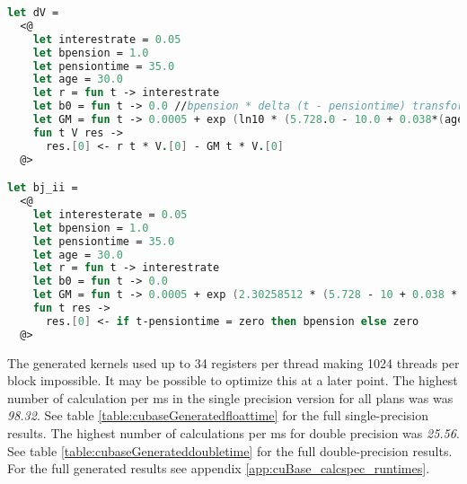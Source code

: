 \begin{lstlisting}[language=fsharp, caption=Formatted quotation AST for dV and bj\_ii methods, label=pe_quote_format]
let dV = 
  <@
    let interestrate = 0.05
    let bpension = 1.0
    let pensiontime = 35.0
    let age = 30.0
    let r = fun t -> interestrate
    let b0 = fun t -> 0.0 //bpension * delta (t - pensiontime) transformed into bj_ii value
    let GM = fun t -> 0.0005 + exp (ln10 * (5.728.0 - 10.0 + 0.038*(age + t))) // power expression converted to exponential function expressions
    fun t V res ->
      res.[0] <- r t * V.[0] - GM t * V.[0]
  @>

let bj_ii = 
  <@
    let interesterate = 0.05
    let bpension = 1.0
    let pensiontime = 35.0
    let age = 30.0
    let r = fun t -> interestrate
    let b0 = fun t -> 0.0
    let GM = fun t -> 0.0005 + exp (2.30258512 * (5.728 - 10 + 0.038 * (age + t)))
    fun t res ->
      res.[0] <- if t-pensiontime = zero then bpension else zero
  @>

\end{lstlisting}


The generated kernels used up to 34 registers per thread making 1024 threads per block impossible. 
It may be possible to optimize this at a later point.
The highest number of calculation per ms in the single precision version for all plans was was \emph{98.32}.
See table \ref{table:cubaseGeneratedfloattime} for the full single-precision results. 
The highest number of calculations per ms for double precision was \emph{25.56}.
See table \ref{table:cubaseGenerateddoubletime} for the full double-precision results. 
For the full generated results see appendix \ref{app:cuBase_calcspec_runtimes}.

